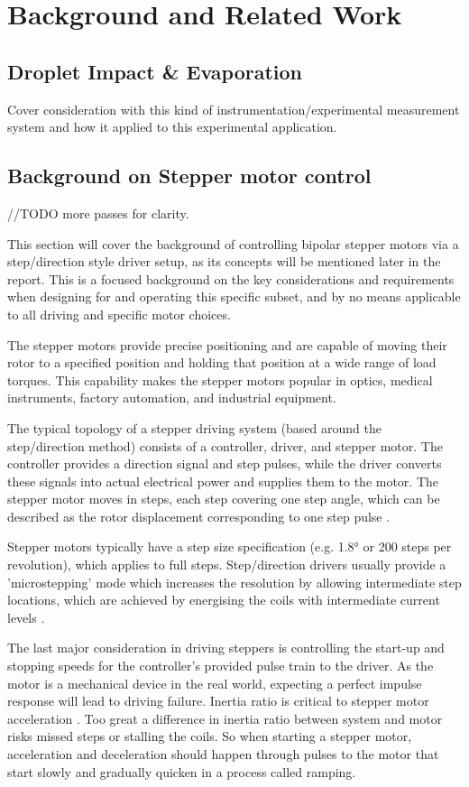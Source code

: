 \chapter{Background and Related Work}\label{C:back}

\section{Droplet Impact \& Evaporation}
Cover consideration with this kind of instrumentation/experimental measurement system and how it applied to this experimental application.

\section{Background on Stepper motor control}
//TODO more passes for clarity.

This section will cover the background of controlling bipolar stepper motors via a step/direction style driver setup, as its concepts will be mentioned later in the report. This is a focused background on the key considerations and requirements when designing for and operating this specific subset, and by no means applicable to all driving and specific motor choices.

The stepper motors provide precise positioning and are capable of moving their rotor to a specified position and holding that position at a wide range of load torques. This capability makes the stepper motors popular in optics, medical instruments, factory automation, and industrial equipment.

The typical topology of a stepper driving system (based around the step/direction method) consists of a controller, driver, and stepper motor. The controller provides a direction signal and step pulses, while the driver converts these signals into actual electrical power and supplies them to the motor. The stepper motor moves in steps, each step covering one step angle, which can be described as the rotor displacement corresponding to one step pulse \cite{step_app}.

Stepper motors typically have a step size specification (e.g. 1.8° or 200 steps per revolution), which applies to full steps. Step/direction drivers usually provide a 'microstepping' mode which increases the resolution by allowing intermediate step locations, which are achieved by energising the coils with intermediate current levels \cite{step_book}.

The last major consideration in driving steppers is controlling the start-up and stopping speeds for the controller's provided pulse train to the driver. As the motor is a mechanical device in the real world, expecting a perfect impulse response will lead to driving failure. Inertia ratio is critical to stepper motor acceleration \cite{step_book}. Too great a difference in inertia ratio between system and motor risks missed steps or stalling the coils. So when starting a stepper motor, acceleration and deceleration should happen through pulses to the motor that start slowly and gradually quicken in a process called ramping.

